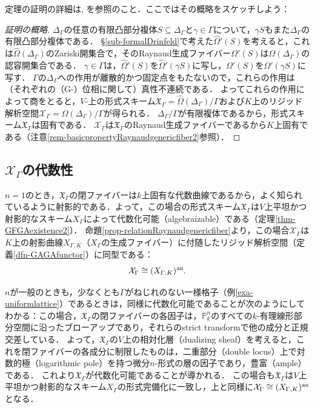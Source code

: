 \documentclass[a4paper,12pt, dvipdfmx]{jsbook}
\def\P{\mathbb{P}}
\def\an{\textsl{an}}
\theoremstyle{plain}
\theoremstyle{definition}
\begin{document}
定理の証明の詳細は\cite{Kuri}, \cite{Must}を参照のこと．ここではその概略をスケッチしよう：
\begin{proof}[証明の概略]
$\Delta_{\Gamma}$の任意の有限凸部分複体$S\subseteq\Delta_{\Gamma}$と$\gamma\in\Gamma$について，$\gamma S$もまた$\Delta_{\Gamma}$の有限凸部分複体である．
\S\ref{sub-formalDrinfeld}で考えた$\widehat{\Omega}'(S)$を考えると，これは$\widehat{\Omega}(\Delta_{\Gamma})$のZariski開集合で，そのRaynaud生成ファイバー$\Omega'(S)$は$\Omega(\Delta_{\Gamma})$の認容開集合である．
$\gamma\in\Gamma$は，$\widehat{\Omega}'(S)$を$\widehat{\Omega}'(\gamma S)$に写し，$\Omega'(S)$を$\Omega'(\gamma S)$に写す．
$\Gamma$の$\Delta_{\Gamma}$への作用が離散的かつ固定点をもたないので，これらの作用は（それぞれの（G-）位相に関して）真性不連続である．
よってこれらの作用によって商をとると，$V$-上の形式スキーム$\mathfrak{X}_{\Gamma}=\widehat{\Omega}(\Delta_{\Gamma})/\Gamma$および$K$上のリジッド解析空間$\mathcal{X}_{\Gamma}=\Omega(\Delta_{\Gamma})/\Gamma$が得られる．
$\Delta_{\Gamma}/\Gamma$が有限複体であるから，形式スキーム$\mathfrak{X}_{\Gamma}$は固有である．
$\mathcal{X}_{\Gamma}$は$\mathfrak{X}_{\Gamma}$のRaynaud生成ファイバーであるから$K$上固有である（注意\ref{rem-basicpropertyRaynaudgenericfiber2}参照）．
\end{proof}

\subsection{$\mathcal{X}_{\Gamma}$の代数性}\label{sub-algebrazablity}
$n=1$のとき，$\mathfrak{X}_{\Gamma}$の閉ファイバーは$k$上固有な代数曲線であるから，よく知られているように射影的である．よって，この場合の形式スキーム$\mathfrak{X}_{\Gamma}$は$V$上平坦かつ射影的なスキーム$X_{\Gamma}$によって代数化可能（algebraizable）である（定理\ref{thm-GFGAexistence2}）．
命題\ref{prop-relationRaynaudgenericfiber}より，この場合$\mathcal{X}_{\Gamma}$は$K$上の射影曲線$X_{\Gamma,K}$（$X_{\Gamma}$の生成ファイバー）に付随したリジッド解析空間（定義\ref{dfn-GAGAfunctor}）に同型である：
$$
\mathcal{X}_{\Gamma}\cong(X_{\Gamma,K})^{\an}.
$$

$n$が一般のときも，少なくとも$\Gamma$がねじれのない一様格子（例\ref{exa-uniformlattice}）であるときは，同様に代数化可能であることが次のようにしてわかる：この場合，$\mathfrak{X}_{\Gamma}$の閉ファイバーの各因子は，$\P^n_k$のすべての$k$-有理線形部分空間に沿ったブローアップであり，それらのstrict transformで他の成分と正規交差している．
よって，$\mathfrak{X}_{\Gamma}$の$V$上の相対化層（dualizing sheaf）を考えると，これを閉ファイバーの各成分に制限したものは，二重部分（double locus）上で対数的極（logarithmic pole）を持つ微分$n$-形式の層の因子であり，豊富（ample）である．
これより$\mathfrak{X}_{\Gamma}$が代数化可能であることが導かれる．
この場合も$\mathfrak{X}_{\Gamma}$は$V$上平坦かつ射影的なスキーム$X_{\Gamma}$の形式完備化に一致し，上と同様に$\mathcal{X}_{\Gamma}\cong(X_{\Gamma,K})^{\an}$となる．
\end{document}
